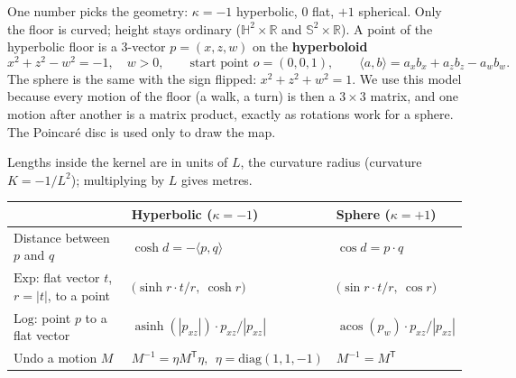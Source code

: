 \documentclass[10pt]{article}
\newcommand{\Sub}[1]{\Needspace{18mm}\vspace{2.5mm}\noindent{\bfseries\color{accD}#1}\par\vspace{0.3mm}}
\newcommand{\R}{\mathbb{R}}
\newcommand{\Hyp}{\mathbb{H}^2}
\newcommand{\Sph}{\mathbb{S}^2}
\begin{document}
\begin{center}
\end{center}

\Sub{Where a point lives}

One number picks the geometry: $\kappa=-1$ hyperbolic, $0$ flat, $+1$ spherical. Only the floor is curved; height stays ordinary ($\Hyp\times\R$ and $\Sph\times\R$). A point of the hyperbolic floor is a 3-vector $p=(x,z,w)$ on the \textbf{hyperboloid}
\[
x^2+z^2-w^2=-1,\quad w>0,\qquad \text{start point } o=(0,0,1),\qquad \langle a,b\rangle=a_xb_x+a_zb_z-a_wb_w .
\]
The sphere is the same with the sign flipped: $x^2+z^2+w^2=1$. We use this model because every motion of the floor (a walk, a turn) is then a $3\times3$ matrix, and one motion after another is a matrix product, exactly as rotations work for a sphere. The Poincar\'e disc is used only to draw the map.

Lengths inside the kernel are in units of $L$, the curvature radius (curvature $K=-1/L^2$); multiplying by $L$ gives metres.

\begin{center}\small
\begin{tabular}{@{}lll@{}}
\toprule
 & \textbf{Hyperbolic} ($\kappa=-1$) & \textbf{Sphere} ($\kappa=+1$)\\
\midrule
Distance between $p$ and $q$ & $\cosh d=-\langle p,q\rangle$ & $\cos d=p\cdot q$\\
$\mathrm{Exp}$: flat vector $t$, $r=|t|$, to a point & $\big(\sinh r\cdot t/r,\ \cosh r\big)$ & $\big(\sin r\cdot t/r,\ \cos r\big)$\\
$\mathrm{Log}$: point $p$ to a flat vector & $\operatorname{asinh}(|p_{xz}|)\cdot p_{xz}/|p_{xz}|$ & $\operatorname{acos}(p_w)\cdot p_{xz}/|p_{xz}|$\\
Undo a motion $M$ & $M^{-1}=\eta M^{\mathsf T}\eta,\ \ \eta=\mathrm{diag}(1,1,-1)$ & $M^{-1}=M^{\mathsf T}$\\
\bottomrule
\end{tabular}
\end{center}
\end{document}
